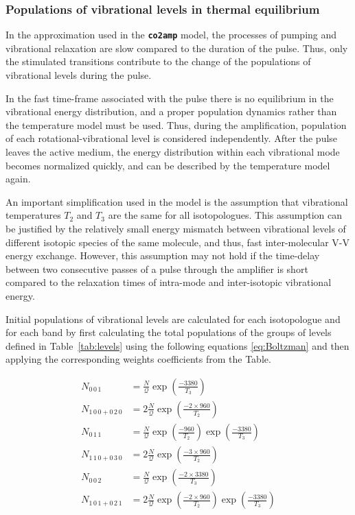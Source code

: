 \documentclass{report}
\begin{document}
\subsubsection{Populations of vibrational levels in thermal equilibrium}

In the approximation used in the \textbf{\texttt{co2amp}} model, the processes of pumping and vibrational relaxation are slow compared to the duration of the pulse. Thus, only the stimulated transitions contribute to the change of the populations of vibrational levels during the pulse.

In the fast time-frame associated with the pulse there is no equilibrium in the vibrational energy distribution, and a proper population dynamics rather than the temperature model must be used. Thus, during the amplification, population of each rotational-vibrational level is considered independently. After the pulse leaves the active medium, the energy distribution within each vibrational mode becomes normalized quickly, and can be described by the temperature model again.

An important simplification used in the model is the assumption that vibrational temperatures $T_2$ and $T_3$ are the same for all  isotopologues. This assumption can be justified by the relatively small energy mismatch between vibrational levels of different isotopic species of the same molecule, and thus, fast inter-molecular V-V energy exchange. However, this assumption may not hold if the time-delay between two consecutive passes of a pulse through the amplifier is short compared to the relaxation times of intra-mode and inter-isotopic vibrational energy.


Initial populations of vibrational levels are calculated for each isotopologue and for each band by first calculating the total populations of the groups of levels defined in Table~\ref{tab:levels} using the following equations \ref{eq:Boltzman} and then applying the corresponding weights coefficients from the Table.

\begin{equation}\label{eq:Boltzman}
\begin{aligned}
N_{0\,0\,1}           &=   \frac{N}{\mathcal{Q}} \exp\left(\frac{-3380}{T_3}\right)\\
N_{1\,0\,0 + 0\,2\,0} &= 2 \frac{N}{\mathcal{Q}} \exp\left(\frac{-2\times 960}{T_2}\right)\\
N_{0\,1\,1}           &=   \frac{N}{\mathcal{Q}} \exp\left(\frac{-960}{T_2}\right) \exp\left(\frac{-3380}{T_3}\right)\\
N_{1\,1\,0 + 0\,3\,0} &= 2 \frac{N}{\mathcal{Q}} \exp\left(\frac{-3\times 960}{T_2}\right)\\
N_{0\,0\,2}           &=   \frac{N}{\mathcal{Q}} \exp\left(\frac{-2\times 3380}{T_3}\right)\\
N_{1\,0\,1 + 0\,2\,1} &= 2 \frac{N}{\mathcal{Q}} \exp\left(\frac{-2\times 960}{T_2}\right) \exp\left(\frac{-3380}{T_3}\right)
\end{aligned}
\end{equation}
\end{document}
